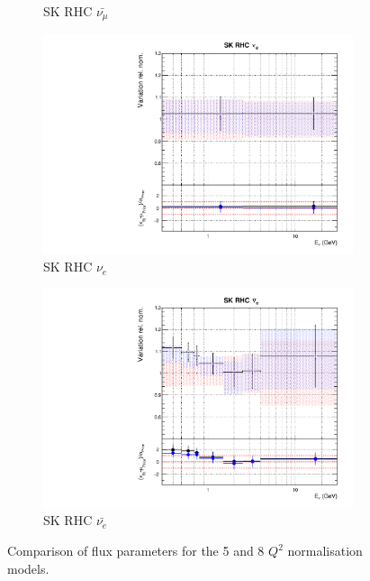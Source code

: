 \begin{figure}
\begin{subfigure}{0.24\textwidth}
  \caption{SK RHC $\bar{\nu_{\mu}}$}
\end{subfigure}
\begin{subfigure}{0.24\textwidth}
  \centering
  \includegraphics[width=0.95\linewidth]{figs/comp5q2vs8q2flux14}
  \caption{SK RHC $\nu_{e}$}
\end{subfigure}
\begin{subfigure}{0.24\textwidth}
  \centering
  \includegraphics[width=0.95\linewidth]{figs/comp5q2vs8q2flux15}
  \caption{SK RHC $\bar{\nu_e}$}
\end{subfigure}
\caption{Comparison of flux parameters for the 5 and 8 $Q^2$ normalisation models.}
\label{fig:comp5q2vs8q2flux}
\end{figure}

